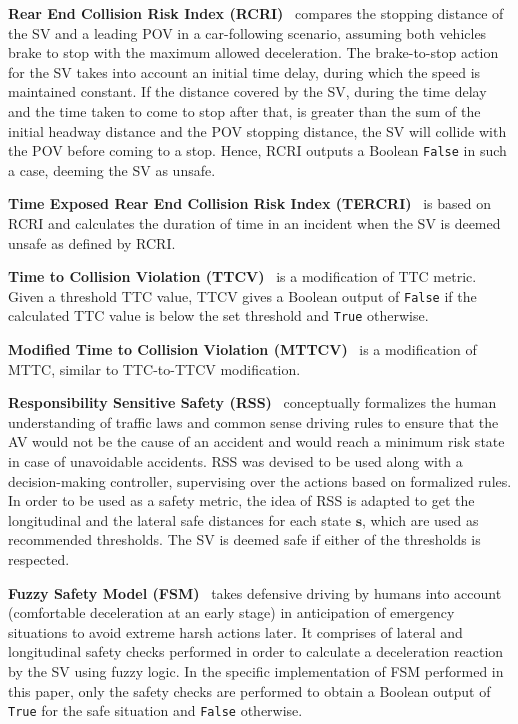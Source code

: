 \documentclass[journal]{IEEEtran}
\newcommand{\s}{\mathbf{s}}
\begin{document}
\textbf{Rear End Collision Risk Index (RCRI)}~\cite{oh2006method} compares the stopping distance of the SV and a leading POV in a car-following scenario, assuming both vehicles brake to stop with the maximum allowed deceleration. The brake-to-stop action for the SV takes into account an initial time delay, during which the speed is maintained constant. If the distance covered by the SV, during the time delay and the time taken to come to stop after that, is greater than the sum of the initial headway distance and the POV stopping distance, the SV will collide with the POV before coming to a stop. Hence, RCRI outputs a Boolean \texttt{False} in such a case, deeming the SV as unsafe.

\textbf{Time Exposed Rear End Collision Risk Index (TERCRI)}~\cite{rahman2018longitudinal} is based on RCRI and calculates the duration of time in an incident when the SV is deemed unsafe as defined by RCRI. 

\textbf{Time to Collision Violation (TTCV)}~\cite{mahmud2017application} is a modification of TTC metric. Given a threshold TTC value, TTCV gives a Boolean output of \texttt{False} if the calculated TTC value is below the set threshold and \texttt{True} otherwise.

\textbf{Modified Time to Collision Violation (MTTCV)}~\cite{Ozbay2008Derivation} is a modification of MTTC, similar to TTC-to-TTCV modification. 

\textbf{Responsibility Sensitive Safety (RSS)}~\cite{shalev2017formal} conceptually formalizes the human understanding of traffic laws and common sense driving rules to ensure that the AV would not be the cause of an accident and would reach a minimum risk state in case of unavoidable accidents. RSS was devised to be used along with a decision-making controller, supervising over the actions based on formalized rules. In order to be used as a safety metric, the idea of RSS is adapted to get the longitudinal and the lateral safe distances for each state $\s$, which are used as recommended thresholds. The SV is deemed safe if either of the thresholds is respected.


\textbf{Fuzzy Safety Model (FSM)}~\cite{mattas2020fuzzy} takes defensive driving by humans into account (comfortable deceleration at an early stage) in anticipation of emergency situations to avoid extreme harsh actions later. It comprises of lateral and longitudinal safety checks performed in order to calculate a deceleration reaction by the SV using fuzzy logic. In the specific implementation of FSM performed in this paper, only the safety checks are performed to obtain a Boolean output of \texttt{True} for the safe situation and \texttt{False} otherwise.
\end{document}
